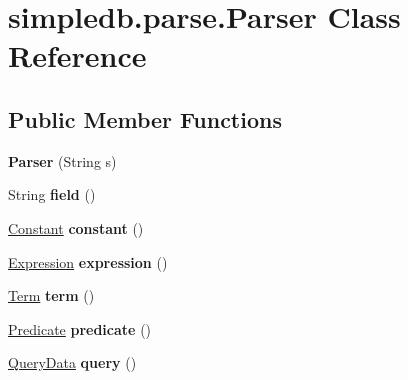 \hypertarget{classsimpledb_1_1parse_1_1Parser}{}\section{simpledb.\+parse.\+Parser Class Reference}
\label{classsimpledb_1_1parse_1_1Parser}
\subsection*{Public Member Functions}
\begin{DoxyCompactItemize}
\item 
\mbox{\label{classsimpledb_1_1parse_1_1Parser_ab059f307add33e73d1c7b0a8058201d8}} 
{\bfseries Parser} (String s)
\item 
\mbox{\label{classsimpledb_1_1parse_1_1Parser_a0808cbcaf5514af6f52f5be4bcbd8a04}} 
String {\bfseries field} ()
\item 
\mbox{\label{classsimpledb_1_1parse_1_1Parser_a56fa46565e0f8888359a3a7e18571e22}} 
\hyperlink{classsimpledb_1_1query_1_1Constant}{Constant} {\bfseries constant} ()
\item 
\mbox{\label{classsimpledb_1_1parse_1_1Parser_acabc6f86cbc46f0fb0d1a9e824e1601e}} 
\hyperlink{classsimpledb_1_1query_1_1Expression}{Expression} {\bfseries expression} ()
\item 
\mbox{\label{classsimpledb_1_1parse_1_1Parser_a4d09ca9a1868f38ec96f686fac40737a}} 
\hyperlink{classsimpledb_1_1query_1_1Term}{Term} {\bfseries term} ()
\item 
\mbox{\label{classsimpledb_1_1parse_1_1Parser_aebb40d751b5893be3022772a4086b848}} 
\hyperlink{classsimpledb_1_1query_1_1Predicate}{Predicate} {\bfseries predicate} ()
\item 
\mbox{\label{classsimpledb_1_1parse_1_1Parser_af6ee4fcfa1288cd2038cc074c8613b22}} 
\hyperlink{classsimpledb_1_1parse_1_1QueryData}{Query\+Data} {\bfseries query} ()
\item 

\end{DoxyCompactItemize}
